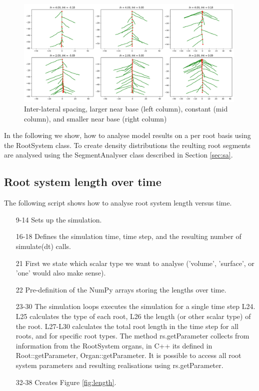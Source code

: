 \begin{figure}
\centering
\includegraphics[width=0.99\textwidth]{fig_lateralspacing.png}
\caption{Inter-lateral spacing, larger near base (left column), constant (mid column), and smaller near base (right column) } \label{fig:spacing}
\end{figure}

In the following we show, how to analyse model results on a per root basis using the RootSystem class. To create density distributions the reulting root segments are analysed using the SegmentAnalyser class described in Section \ref{sec:sa}.


\subsection{Root system length over time}

The following script shows how to analyse root system length versus time. 



\begin{itemize}
\item[9-14] Sets up the simulation.

\item[16-18] Defines the simulation time, time step, and the resulting number of simulate(dt) calls. 

\item[21] First we state which scalar type we want to analyse ('volume', 'surface', or 'one' would also make sense). 

\item[22] Pre-definition of the NumPy arrays storing the lengths over time. 

\item[23-30] The simulation loops executes the simulation for a single time step L24. L25 calculates the type of each root, L26 the length (or other scalar type) of the root. L27-L30 calculates the total root length in the time step for all roots, and for specific root types. The method rs.getParameter collects from information from the RootSystem organs, in C++ its defined in Root::getParameter, Organ::getParameter. It is possible to access all root system parameters and resulting realisations using rs.getParameter.

\item[32-38] Creates Figure \ref{fig:length}.

\end{itemize}



